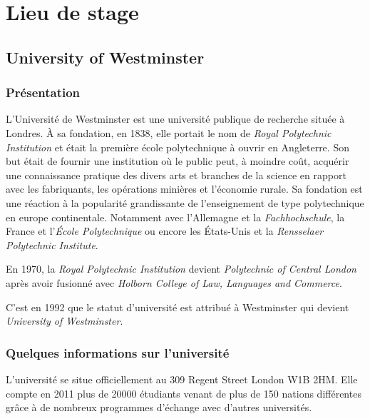 \chapter{Lieu de stage}

\section{University of Westminster}

\subsection{Pr\'esentation}

L'Universit\'e de Westminster est une universit\'e publique de recherche situ\'ee \`a Londres. 
\`A sa fondation, en 1838, elle portait le nom de \textit{Royal Polytechnic Institution} et \'etait la premi\`ere \'ecole polytechnique \`a ouvrir en Angleterre.
Son but \'etait de fournir une institution o\`u le public peut, \`a moindre co\^ut, acqu\'erir une connaissance pratique des divers arts et branches de la science en rapport avec les fabriquants, les op\'erations mini\`eres et l'\'economie rurale.
Sa fondation est une r\'eaction \`a la popularit\'e grandissante de l'enseignement de type polytechnique en europe continentale. 
Notamment avec l'Allemagne et la \textit{Fachhochschule}, la France et l'\textit{\'Ecole Polytechnique} ou encore les \'Etats-Unis et la \textit{Rensselaer Polytechnic Institute}.

En 1970, la \textit{Royal Polytechnic Institution} devient \textit{Polytechnic of Central London} apr\`es avoir fusionn\'e avec \textit{Holborn College of Law, Languages and Commerce}.

C'est en 1992 que le statut d'universit\'e est attribu\'e \`a Westminster qui devient \textit{University of Westminster}.


\subsection{Quelques informations sur l'universit\'e}

L'universit\'e se situe officiellement au 309 Regent Street London W1B 2HM.
Elle compte en 2011 plus de 20000 \'etudiants venant de plus de 150 nations diff\'erentes gr\^ace \`a de nombreux programmes d'\'echange avec d'autres universit\'es.

